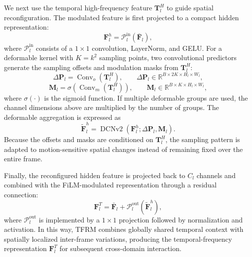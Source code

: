\documentclass[lettersize,journal]{IEEEtran}
\begin{document}
We next use the temporal high-frequency feature
$\mathbf{T}_{l}^{H}$
to guide spatial reconfiguration. The modulated feature is first projected to a compact hidden representation:
\begin{equation}
\mathbf{F}_{l}^{h}
=
\mathcal{P}_{l}^{\mathrm{in}}
\left(
\bar{\mathbf{F}}_{l}
\right),
\end{equation}
where $\mathcal{P}_{l}^{\mathrm{in}}$ consists of a $1\times1$ convolution, LayerNorm, and GELU. For a deformable kernel with $K=k^{2}$ sampling points, two convolutional predictors generate the sampling offsets and modulation masks from $\mathbf{T}_{l}^{H}$:
\begin{equation}
\Delta\mathbf{P}_{l}
=
\operatorname{Conv}_{o}
\left(
\mathbf{T}_{l}^{H}
\right),
\qquad
\Delta\mathbf{P}_{l}
\in
\mathbb{R}^{B\times2K\times H_l\times W_l},
\end{equation}
\begin{equation}
\mathbf{M}_{l}
=
\sigma
\left(
\operatorname{Conv}_{m}
\left(
\mathbf{T}_{l}^{H}
\right)
\right),
\qquad
\mathbf{M}_{l}
\in
\mathbb{R}^{B\times K\times H_l\times W_l},
\end{equation}
where $\sigma(\cdot)$ is the sigmoid function. If multiple deformable groups are used, the channel dimensions above are multiplied by the number of groups. The deformable aggregation is expressed as
\begin{equation}
\tilde{\mathbf{F}}_{l}^{h}
=
\operatorname{DCNv2}
\left(
\mathbf{F}_{l}^{h};
\Delta\mathbf{P}_{l},
\mathbf{M}_{l}
\right).
\label{eq:dcn}
\end{equation}
Because the offsets and masks are conditioned on $\mathbf{T}_{l}^{H}$, the sampling pattern is adapted to motion-sensitive spatial changes instead of remaining fixed over the entire frame.

Finally, the reconfigured hidden feature is projected back to $C_l$ channels and combined with the FiLM-modulated representation through a residual connection:
\begin{equation}
\mathbf{F}_{l}^{T}
=
\bar{\mathbf{F}}_{l}
+
\mathcal{P}_{l}^{\mathrm{out}}
\left(
\tilde{\mathbf{F}}_{l}^{h}
\right),
\label{eq:tfrm_out}
\end{equation}
where $\mathcal{P}_{l}^{\mathrm{out}}$ is implemented by a $1\times1$ projection followed by normalization and activation. In this way, TFRM combines globally shared temporal context with spatially localized inter-frame variations, producing the temporal-frequency representation $\mathbf{F}_{l}^{T}$ for subsequent cross-domain interaction.
\end{document}
